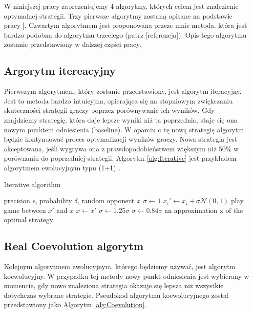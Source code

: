 \documentclass[inzynierska]{pwr_wmat_praca_dyplomowa}
\theoremstyle{plain}
\numberwithin{theorem}{chapter}
\theoremstyle{definition}
\numberwithin{theorem}{chapter}
\begin{document}
	W niniejszej pracy zaprezentujemy 4 algorytmy, których celem jest znalezienie optymalnej strategii. Trzy pierwsze algorytmy zostaną opisane na podstawie pracy \cite{cauwet2018surprising}]. Czwartym algorytmem jest proponowana przeze mnie metoda, która jest bardzo podobna do algorytmu trzeciego (patrz [referencja]). Opis tego algorytmu zostanie przedstawiony w dalszej części pracy.

	\subsection{Argorytm itereacyjny}
		Pierwszym algorytmem, który zostanie przedstawiony, jest algorytm iteracyjny. Jest to metoda bardzo intuicyjna, opierająca się na stopniowym zwiększaniu skuteczności strategii graczy poprzez porównywanie ich wyników. Gdy znajdziemy strategię, która daje lepsze wyniki niż ta poprzednia, staje się ona nowym punktem odniesienia (baseline). W oparciu o tę nową strategię algorytm będzie kontynuować proces optymalizacji wyników graczy. Nowa strategia jest akceptowana, jeśli wygrywa ona z prawdopodobieństwem większym niż 50\% w porównaniu do poprzedniej strategii. Algorytm \ref{alg:Iterative} jest przykładem algorytmem ewolucyjnym typu (1+1) \cite{droste1998rigorous}.
		\begin{algorithm}\captionsetup{labelformat=custom2}
			\caption{Iterative algorithm}\label{alg:Iterative}
			\begin{algorithmic}
				\Ensure  precision $\epsilon$, probability $\delta$, random opponent $x$
				\State $\sigma \gets 1 $ 
				\State $x_i' \gets x_i + \sigma \mathcal{N}(0,1)$ 
				\EndFor
				\Repeat
				\State play game between $x'$ and $x$
				\State $x \gets x'$
				\State $\sigma \gets 1.25\sigma$
				\Else
				\State $\sigma \gets 0.84 \sigma$
				\EndIf
				\EndWhile
				\State \Return an approximation x of the optimal strategy
			\end{algorithmic}
		\end{algorithm}

	\subsection{Real Coevolution algorytm}	
	Kolejnym algorytmem ewolucyjnym, którego będziemy używać, jest algorytm koewolucyjny. W przypadku tej metody nowy punkt odniesienia jest wybierany w momencie, gdy nowo znaleziona strategia okazuje się lepsza niż wszystkie dotychczas wybrane strategie. Pseudokod algorytmu koewolucyjnego został przedstawiony jako Algorytm \ref{alg:Coevolution}. 
\end{document}
